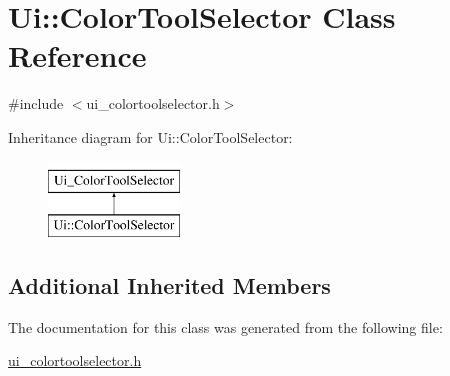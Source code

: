 \hypertarget{class_ui_1_1_color_tool_selector}{}\section{Ui\+:\+:Color\+Tool\+Selector Class Reference}
\label{class_ui_1_1_color_tool_selector}


{\ttfamily \#include $<$ui\+\_\+colortoolselector.\+h$>$}

Inheritance diagram for Ui\+:\+:Color\+Tool\+Selector\+:\begin{figure}[H]
\begin{center}
\leavevmode
\includegraphics[height=2.000000cm]{class_ui_1_1_color_tool_selector}
\end{center}
\end{figure}
\subsection*{Additional Inherited Members}


The documentation for this class was generated from the following file\+:\begin{DoxyCompactItemize}
\item 
\hyperlink{ui__colortoolselector_8h}{ui\+\_\+colortoolselector.\+h}\end{DoxyCompactItemize}
